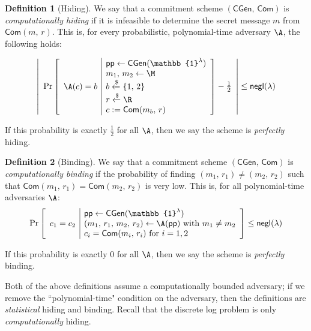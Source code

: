 \documentclass{article}
\theoremstyle{definition}
\newtheorem{definition}{Definition}
\newcommand{\6}{\mathbf}
\newcommand{\7}{\mathcal}
\newcommand{\lar}{\leftarrow}
\newcommand{\lsamp}{\xleftarrow{\$}}
\newcommand{\one}{\mathbb{1}}
\renewcommand{\sf}[1]{{\mathsf{#1}}}
\begin{document}
\begin{definition}[Hiding]\label{def:hiding}
    We say that a commitment scheme $(\mathsf{CGen}, \,\mathsf{Com})$ is \textit{computationally hiding} if it is infeasible to determine the secret message $m$ from $\mathsf{Com}(m, \, r)$.
    This is, for every probabilistic, polynomial-time adversary $\A$, the following holds:
    
    $$\left|\begin{array}{c}
    \text{Pr}\left[ \begin{array}{l|l}
      & \sf{pp} \lar \mathsf{CGen}(\one^\lambda) \\
      & m_1, \, m_2 \lar \M \\
      \A(c)=b & b \lsamp \{1, \, 2\} \\ 
       & r \lsamp \R \\
     & c := \mathsf{Com} (m_b, \, r)
    \end{array} \right] - \frac{1}{2} 
    \end{array} \right| \leq \sf{negl}(\lambda)$$

    If this probability is exactly $\frac{1}{2}$ for all $\A$, then we say the scheme is \textit{perfectly} hiding. 
\end{definition}
\medskip



\begin{definition}[Binding]\label{def:binding}
    We say that a commitment scheme $(\mathsf{CGen}, \,\mathsf{Com})$ is \textit{computationally binding} if 
    the probability of finding $(m_1, \, r_1) \neq (m_2, \, r_2)$ such that $\mathsf{Com}(m_1, \, r_1) = \mathsf{Com}(m_2, \, r_2)$ is very low. This is, for all polynomial-time adversaries $\A$:
    $$\text{Pr}\left[ \begin{array}{l|l}
      & \sf{pp} \lar \mathsf{CGen}(\one^\lambda) \\
      c_1 = c_2 & (m_1, \, r_1, \, m_2, \, r_2) \lar \A(\sf{pp}) \text{ with } m_1 \neq m_2 \\
      & c_i = \mathsf{Com}(m_i, \, r_i) \text{ for } i=1,2 \\
    \end{array} \right] \leq \sf{negl}(\lambda)$$

    If this probability is exactly $0$ for all $\A$, then we say the scheme is \textit{perfectly} binding.
\end{definition}
\medskip

Both of the above definitions assume a computationally bounded adversary; if we remove the ``polynomial-time" condition on the adversary, then the definitions are \textit{statistical} hiding and binding. 
Recall that the discrete log problem is only \textit{computationally} hiding.
\medskip 
\end{document}
